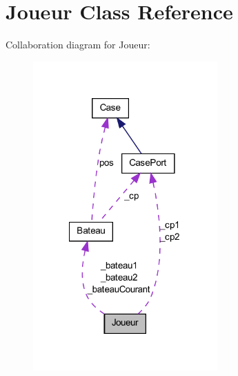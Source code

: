 \hypertarget{class_joueur}{
\section{Joueur Class Reference}
\label{class_joueur}
}


Collaboration diagram for Joueur:
\nopagebreak
\begin{figure}[H]
\begin{center}
\leavevmode
\includegraphics[width=200pt]{class_joueur__coll__graph}
\end{center}
\end{figure}
